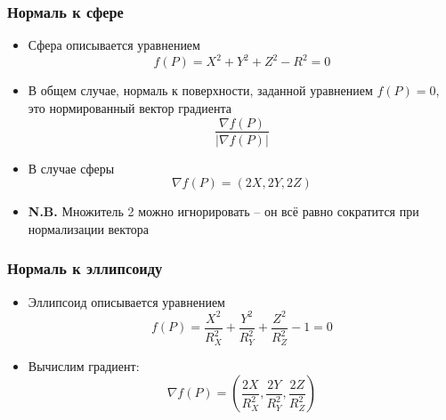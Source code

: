 \documentclass[10pt]{beamer}
\begin{document}
\begin{frame}[fragile]
\frametitle{Нормаль к сфере}
\begin{itemize}
\item Сфера описывается уравнением \begin{equation*}f(P) = X^2+Y^2+Z^2-R^2 = 0\end{equation*}
\pause
\item В общем случае, нормаль к поверхности, заданной уравнением \begin{math}f(P)=0\end{math}, это нормированный вектор градиента \begin{equation*}\frac{\nabla f(P)}{|\nabla f(P)|}\end{equation*}
\pause
\item В случае сферы \begin{equation*}\nabla f(P) = (2X, 2Y, 2Z)\end{equation*}
\pause
\item \alert{\textbf{N.B.}} Множитель 2 можно игнорировать -- он всё равно сократится при нормализации вектора
\end{itemize}
\end{frame}

\begin{frame}[fragile]
\frametitle{Нормаль к эллипсоиду}
\begin{itemize}
\item Эллипсоид описывается уравнением \begin{equation*}f(P) = \frac{X^2}{R_X^2}+\frac{Y^2}{R_Y^2}+\frac{Z^2}{R_Z^2}-1 = 0\end{equation*}
\pause
\item Вычислим градиент: \begin{equation*}\nabla f(P) = \left(\frac{2X}{R_X^2}, \frac{2Y}{R_Y^2}, \frac{2Z}{R_Z^2}\right)\end{equation*}
\end{itemize}
\end{frame}
\end{document}
